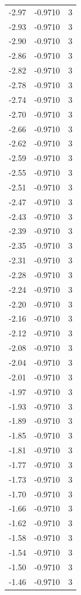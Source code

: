\begin{longtable}{lrr}
  -2.97 & -0.9710 & 3 \\
  -2.93 & -0.9710 & 3 \\
  -2.90 & -0.9710 & 3 \\
  -2.86 & -0.9710 & 3 \\
  -2.82 & -0.9710 & 3 \\
  -2.78 & -0.9710 & 3 \\
  -2.74 & -0.9710 & 3 \\
  -2.70 & -0.9710 & 3 \\
  -2.66 & -0.9710 & 3 \\
  -2.62 & -0.9710 & 3 \\
  -2.59 & -0.9710 & 3 \\
  -2.55 & -0.9710 & 3 \\
  -2.51 & -0.9710 & 3 \\
  -2.47 & -0.9710 & 3 \\
  -2.43 & -0.9710 & 3 \\
  -2.39 & -0.9710 & 3 \\
  -2.35 & -0.9710 & 3 \\
  -2.31 & -0.9710 & 3 \\
  -2.28 & -0.9710 & 3 \\
  -2.24 & -0.9710 & 3 \\
  -2.20 & -0.9710 & 3 \\
  -2.16 & -0.9710 & 3 \\
  -2.12 & -0.9710 & 3 \\
  -2.08 & -0.9710 & 3 \\
  -2.04 & -0.9710 & 3 \\
  -2.01 & -0.9710 & 3 \\
  -1.97 & -0.9710 & 3 \\
  -1.93 & -0.9710 & 3 \\
  -1.89 & -0.9710 & 3 \\
  -1.85 & -0.9710 & 3 \\
  -1.81 & -0.9710 & 3 \\
  -1.77 & -0.9710 & 3 \\
  -1.73 & -0.9710 & 3 \\
  -1.70 & -0.9710 & 3 \\
  -1.66 & -0.9710 & 3 \\
  -1.62 & -0.9710 & 3 \\
  -1.58 & -0.9710 & 3 \\
  -1.54 & -0.9710 & 3 \\
  -1.50 & -0.9710 & 3 \\
  -1.46 & -0.9710 & 3 \\

\end{longtable}
